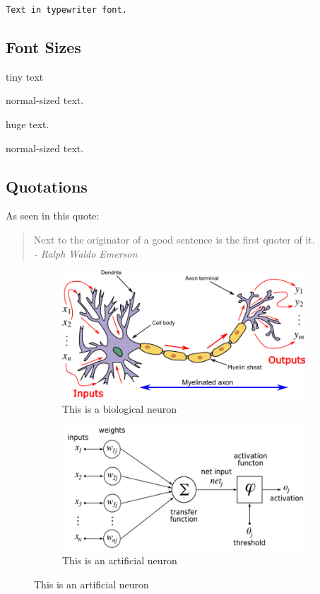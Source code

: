 \documentclass[a4paper, twocolumn]{article}
\begin{document}
	{\tt Text in typewriter font.}
	
	\subsection{Font Sizes}
	{\tiny tiny text} \\
	\begin{normalsize}
		normal-sized text. \\
	\end{normalsize}
	\begin{huge}
		huge text.
	\end{huge}
	
	normal-sized text. 
	
	\subsection{Quotations}
	As seen in this quote:
	
	\begin{quote}
		Next to the originator of a good sentence
		is the first quoter of it. \\
		\textit{- Ralph Waldo Emerson}
	\end{quote}
	
		\begin{figure}
		\begin{subfigure}{0.25\textwidth} %
			\includegraphics[width=\linewidth]{Figures/bio-neuron.png}
			\caption{This is a biological neuron}
			\label{fig:bio-neur2}
		\end{subfigure}
		
		\begin{subfigure}{0.25\textwidth}
			\includegraphics[width=\linewidth]{Figures/artificial-neuron.png}
			\caption{This is an artificial neuron}
			\label{fig:artificial-neuron2}
		\end{subfigure}
	\end{figure}
	
\end{document}
